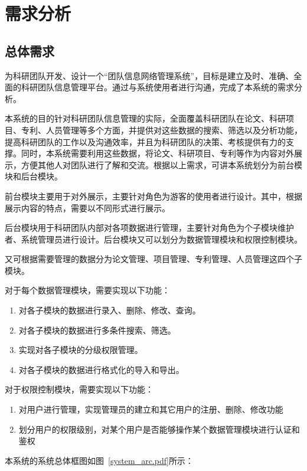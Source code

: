 \chapter{需求分析}
\section{总体需求}
为科研团队开发、设计一个“团队信息网络管理系统”，目标是建立及时、准确、全面的科研团队信息管理平台。通过与系统使用者进行沟通，完成了本系统的需求分析。

本系统的目的针对科研团队信息管理的实际，全面覆盖科研团队在论文、科研项目、专利、人员管理等多个方面，并提供对这些数据的搜索、筛选以及分析功能，提高科研团队的工作以及沟通效率，并且为科研团队的决策、考核提供有力的支撑。同时，本系统需要利用这些数据，将论文、科研项目、专利等作为内容对外展示，方便其他人对团队进行了解和交流。根据以上需求，可讲本系统划分为前台模块和后台模块。

前台模块主要用于对外展示，主要针对角色为游客的使用者进行设计。其中，根据展示内容的特点，需要以不同形式进行展示。

后台模块用于科研团队内部对各项数据进行管理，主要针对角色为个子模块维护者、系统管理员进行设计。后台模块又可以划分为数据管理模块和权限控制模块。

又可根据需要管理的数据分为论文管理、项目管理、专利管理、人员管理这四个子模块。

对于每个数据管理模块，需要实现以下功能：

\begin{enumerate}
\item 对各子模块的数据进行录入、删除、修改、查询。
\item 对各子模块的数据进行多条件搜索、筛选。
\item 实现对各子模块的分级权限管理。
\item 对各子模块的数据进行格式化的导入和导出。
\end{enumerate}

对于权限控制模块，需要实现以下功能：

\begin{enumerate}
\item 对用户进行管理，实现管理员的建立和其它用户的注册、删除、修改功能
\item 划分用户的权限级别，对某个用户是否能够操作某个数据管理模块进行认证和鉴权
\end{enumerate}

本系统的系统总体框图如图~\ref{system_arc.pdf}所示：


